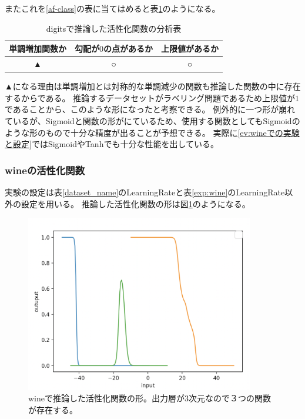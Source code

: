 またこれを\ref{af-class}の表に当てはめると表\ref{anal_digits}のようになる。
\begin{table}[htbp]
    \begin{center}
        \caption{digitsで推論した活性化関数の分析表}
        \label{anal_digits}
        \vspace{2mm} 
        \begin{tabular}{ |c|c|c| }
        \hline
        単調増加関数か & 勾配が$ 0 $の点があるか & 上限値があるか   \\
        \hline
        ▲ & ○ & ○   \\
        \hline
        \end{tabular}
    \end{center}
\end{table}

▲になる理由は単調増加とは対称的な単調減少の関数も推論した関数の中に存在するからである。
推論するデータセットがラベリング問題であるため上限値が$ 1 $であることから、このような形になったと考察できる。
例外的に一つ形が崩れているが、Sigmoidと関数の形がにているため、使用する関数としてもSigmoidのような形のもので十分な精度が出ることが予想できる。
実際に\ref{ev:wineでの実験と設定}ではSigmoidやTanhでも十分な性能を出している。


\subsubsection{wineの活性化関数}
実験の設定は表\ref{dataset_name}のLearningRateと表\ref{exp:wine}のLearningRate以外の設定を用いる。
推論した活性化関数の形は図\ref{infer_wine}のようになる。
\begin{figure}[hbtp]
    \begin{center}
        \includegraphics[width=10cm]{asset/wine-0.01.png}
            \caption{wineで推論した活性化関数の形。出力層が3次元なので３つの関数が存在する。}
            \label{infer_wine}
    \end{center}
\end{figure}

